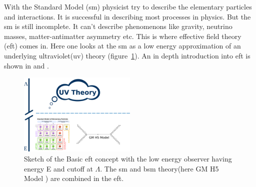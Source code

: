 \documentclass[../Bachelorarbeit.tex]{subfiles}
\begin{document}
\label{sec:EFT}
With the Standard Model (\acrshort{sm}) physicist try to describe the elementary particles and interactions. It is successful in describing most processes in physics.
But the \acrshort{sm} is still incomplete. It can't describe phenomenons like gravity, neutrino masses, matter-antimatter asymmetry etc. This is where effective field theory (\acrshort{eft}) comes in.
Here one looks at the \acrshort{sm} as a low energy approximation of an underlying ultraviolet(\acrshort{uv}) theory (figure~\ref{fig:EFT_sketch}). An in depth introduction into \acrshort{eft} is shown in \cite{Pich.1998} and \cite{Brivio.2019}.

\begin{figure}[h]
    \centering
    \includegraphics[width=0.5\textwidth]{images/EFT_Model.png}
    \caption{Sketch of the Basic \acrshort{eft} concept with the low energy observer having energy E and cutoff at $\Lambda$. The \acrshort{sm} and \acrshort{bsm} theory(here GM H5 Model \cite{Kundu.28.11.2021}) are combined in the \acrshort{eft}. \cite{Brivio.2017}}
    \label{fig:EFT_sketch}
\end{figure}
\end{document}
